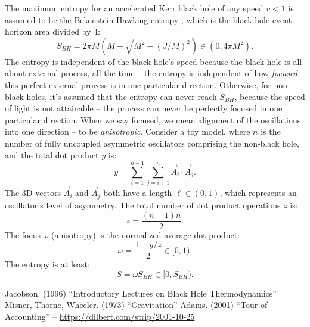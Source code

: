 \documentclass[12pt]{article}
\begin{document}
The maximum entropy for an accelerated Kerr black hole of any speed $v < 1$ is assumed to be the Bekenstein-Hawking entropy \cite{jacobson}, which is the black hole event horizon area divided by $4$:
\begin{equation}
S_{BH} = 2 \pi M \left(M + \sqrt{M^2 - (J/M)^2}\right) \in (0, 4\pi M^2).
\end{equation}
The entropy is independent of the black hole's speed because the black hole is all about external process, all the time -- the entropy is independent of how \textit{focused} this perfect external process is in one particular direction.
Otherwise, for non-black holes, it's assumed that the entropy can never reach $S_{BH}$, because the speed of light is not attainable -- the process can never be perfectly focused in one particular direction.
When we say focused, we mean alignment of the oscillations into one direction -- to be \textit{anisotropic}.
Consider a toy model, where $n$ is the number of fully uncoupled asymmetric oscillators comprising the non-black hole, and the total dot product $y$ is:
\begin{equation}
y = \sum_{i = 1}^{n - 1}  \sum_{j = i + 1}^{n} {\vec{A}}_i  \cdot {\vec{A}}_j.
\end{equation}
The 3D vectors ${\vec{A}}_i$ and ${\vec{A}}_j$ both have a length $\ell \in (0, 1)$, which represents an oscillator's level of asymmetry.
The total number of dot product operations $z$ is:
\begin{equation}
z = \frac{(n - 1)n}{2}.
\end{equation}
The focus $\omega$ (anisotropy) is the normalized average dot product:
\begin{equation}
\omega = \frac{1 + {y}/{z}}{2} \in [0, 1).
\end{equation}
The entropy is at least:
\begin{equation}
S = \omega S_{BH} \in [0,  S_{BH}).
\end{equation}



\begin{thebibliography}{9}
 Jacobson. (1996) ``Introductory Lectures on Black Hole Thermodynamics''
 Misner, Thorne, Wheeler. (1973) ``Gravitation''
 Adams. (2001) ``Tour of Accounting'' -- \url{https://dilbert.com/strip/2001-10-25}
\end{thebibliography}
\end{document}
